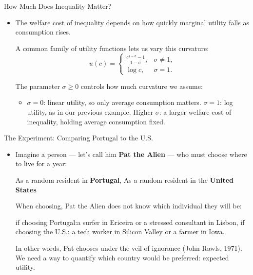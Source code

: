 \documentclass[10pt,aspectratio=169]{beamer}
\begin{document}
\begin{frame}{How Much Does Inequality Matter?}

\begin{itemize}
    \item The welfare cost of inequality depends on how quickly marginal utility falls as consumption rises.

    \itemvso A common family of utility functions lets us vary this curvature:
    \[
        u(c)=
        \begin{cases}
            \displaystyle\frac{c^{1-\sigma}-1}{1-\sigma},
            & \sigma \neq 1, \\[0.6em]
            \log c,
            & \sigma = 1.
        \end{cases}
    \]

    \itemvso The parameter \(\sigma \geq 0\) controls how much curvature we assume:
    \begin{itemize}
        \item \(\sigma=0\): linear utility, so only average consumption matters.
        \itemvso \(\sigma=1\): log utility, as in our previous example.
        \itemvso Higher \(\sigma\): a larger welfare cost of inequality, holding average consumption fixed.
    \end{itemize}

\end{itemize}

\end{frame}


\begin{frame}{The Experiment: Comparing Portugal to the U.S.}
\begin{itemize}
  \item Imagine a person — let’s call him \textbf{Pat the Alien} — who must choose where to live for a year:
  \begin{enumerate}
    \itemvsoo As a random resident in \textbf{Portugal},
    \itemvso As a random resident in the \textbf{United States}
  \end{enumerate}

  \itemvso When choosing, Pat the Alien does not know which individual they will be:
  \begin{itemize}
    \itemvso if choosing Portugal:a surfer in Ericeira or a stressed consultant in Lisbon,
    \itemvso if choosing the U.S.: a tech worker in Silicon Valley or a farmer in Iowa.
  \end{itemize}
  \itemvso In other words, Pat chooses under the veil of ignorance (John Rawls, 1971).
  \itemvso We need a way to quantify which country would be preferred: expected utility.
\end{itemize}
\end{frame}
\end{document}
